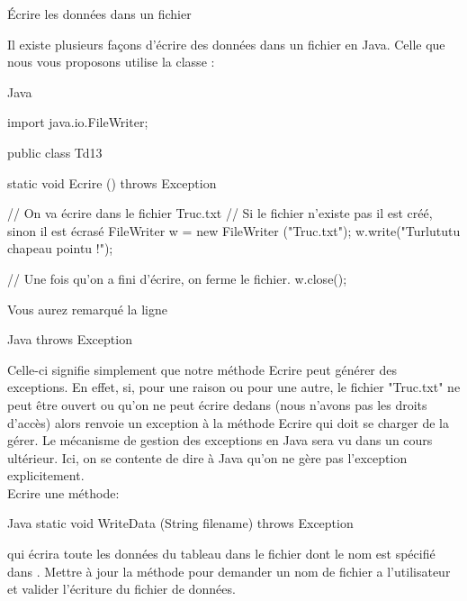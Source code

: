 \documentclass[a4paper,11pt]{article}
\begin{document}
\begin{Exercice}{\'Ecrire les donn\'ees dans un fichier}

Il existe plusieurs fa\c cons d'\'ecrire des donn\'ees dans un fichier en Java. Celle que nous vous proposons utilise la classe :\\

\begin{Code}{Java}

import java.io.FileWriter;

public class Td13
{    
    static void Ecrire () throws Exception
    {
		// On va écrire dans le fichier Truc.txt
		// Si le fichier n'existe pas il est créé, sinon il est écrasé
		FileWriter w = new FileWriter ("Truc.txt");
		w.write("Turlututu chapeau pointu !");
        
        // Une fois qu'on a fini d'écrire, on ferme le fichier.
        w.close();
        
    }
}

\end{Code}

Vous aurez remarqué la ligne \begin{Code}{Java} 
throws Exception 
\end{Code}
Celle-ci signifie simplement que notre méthode Ecrire peut générer des exceptions. En effet, si, pour une raison ou pour une autre, le fichier "Truc.txt" ne peut \^etre ouvert ou qu'on ne peut \'ecrire dedans (nous n'avons pas les droits d'acc\`es) alors  renvoie un exception à la m\'ethode Ecrire qui doit se charger de la gérer. Le m\'ecanisme de gestion des exceptions en Java sera vu dans un cours ult\'erieur. Ici, on se contente de dire \` a Java qu'on ne g\`ere pas l'exception explicitement. \\

Ecrire une m\'ethode:

\begin{Code}{Java} 
static void WriteData (String filename) throws Exception
\end{Code}

qui \'ecrira toute les données du tableau  dans le fichier dont le nom est sp\'ecifi\'e dans . Mettre \`a jour la m\'ethode  pour demander un nom de fichier a l'utilisateur et valider l'\'ecriture du fichier de donn\'ees.





\end{Exercice}
	

	
\end{document}
